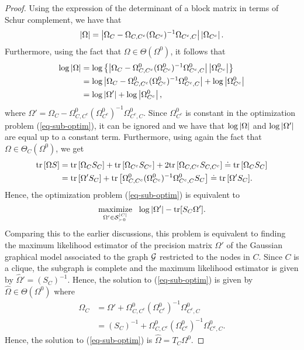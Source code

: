 \begin{proof}
    Using the expression of the determinant of a block matrix in terms of Schur complement, we have that
    \begin{equation*}
        \left|\Omega\right| 
        = \left|\Omega_C - \Omega_{C, C^c}(\Omega_{C^c})^{-1}\Omega_{C^c, C}\right| \left|\Omega_{C^c}\right|.
    \end{equation*}
    Furthermore, using the fact that $\Omega \in \Theta(\Omega^0)$, it follows that
    \begin{align*}
        \log \left|\Omega\right|
        &= \log \left\{ \left|\Omega_C - \Omega^0_{C, C^c}(\Omega^0_{C^c})^{-1}\Omega^0_{C^c, C}\right| \left|\Omega^0_{C^c}\right| \right\}\\
        &= \log \left|\Omega_C - \Omega^0_{C, C^c}(\Omega^0_{C^c})^{-1}\Omega^0_{C^c, C}\right| + \log \left|\Omega^0_{C^c}\right|\\
        &= \log \left|\Omega'\right| + \log \left|\Omega^0_{C^c}\right|,
    \end{align*}
    where $\Omega' = \Omega_C - \Omega^0_{C, C^c}(\Omega^0_{C^c})^{-1}\Omega^0_{C^c, C}$. Since $\Omega^0_{C^c}$ is constant in the optimization problem (\ref{eq-sub-optim}), it can be ignored and we have that $\log \left|\Omega\right|$ and $\log \left|\Omega'\right|$ are equal up to a constant term. Furthermore, using again the fact that $\Omega \in \Theta_C(\Omega^0)$, we get
    \begin{align*}
        {\textrm{tr}\left[\Omega S\right]}
        &= {\textrm{tr}\left[\Omega_C S_C\right]} + {\textrm{tr}\left[\Omega_{C^c} S_{C^c}\right]} + 2 {\textrm{tr}\left[\Omega_{C,C^c} S_{C,C^c}\right]} 
        \doteq {\textrm{tr}\left[\Omega_C S_C\right]} \\
        &= {\textrm{tr}\left[\Omega'S_C\right]} + {\textrm{tr}\left[\Omega^0_{C, C^c}(\Omega^0_{C^c})^{-1}\Omega^0_{C^c, C}S_C\right]}
        \doteq  {\textrm{tr}\left[\Omega'S_C\right]}.
    \end{align*}
    Hence, the optimization problem (\ref{eq-sub-optim}) is equivalent to 
    \begin{equation*}
        \underset{\Omega' \in {\mathcal{S}}_{\succ 0}^{|C|}}{{\textrm{maximize}}}\ \  \log |\Omega'| - {\textrm{tr}}[S_C\Omega'].
    \end{equation*}
    Comparing this to the earlier discussions, this problem is equivalent to finding the maximum likelihood estimator of the precision matrix $\Omega'$ of the Gaussian graphical model associated to the graph ${\mathcal{G}}$ restricted to the nodes in $C$. Since $C$ is a clique, the subgraph is complete and the maximum likelihood estimator is given by $\hat\Omega' = (S_C)^{-1}$. Hence, the solution to (\ref{eq-sub-optim}) is given by $\hat\Omega \in \Theta(\Omega^0)$ where
    \begin{align*}
        \hat\Omega_C
        &= \Omega' + \Omega^0_{C, C^c}(\Omega^0_{C^c})^{-1}\Omega^0_{C^c, C}\\
        &= (S_C)^{-1} + \Omega^0_{C, C^c}(\Omega^0_{C^c})^{-1}\Omega^0_{C^c, C}.
    \end{align*}
    Hence, the solution to (\ref{eq-sub-optim}) is $\hat\Omega = T_C \Omega^0$.
\end{proof}

